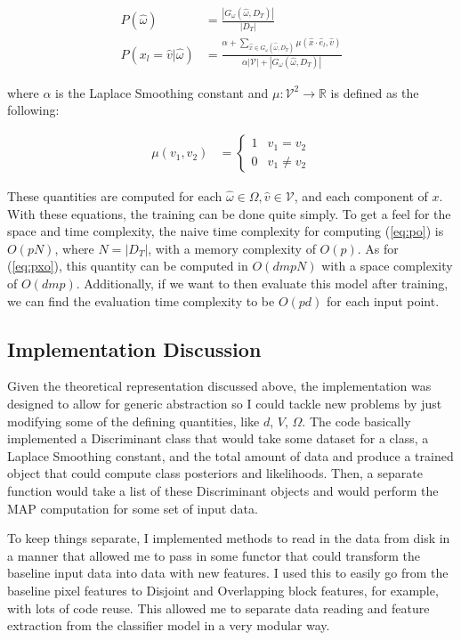 \documentclass{article}[12pt]
\begin{document}
   \begin{align}
   P(\hat{\omega}) &= \frac{|G_{\omega}(\hat{\omega}, D_T)|}{|D_T|} \label{eq:po}\\
   P(x_l = \hat{v} | \hat{\omega}) &= \frac{ \alpha + \sum_{ \hat{x} \in G_{\omega}(\hat{\omega}, D_T) } \mu(\hat{x} \cdot \hat{e}_l, \hat{v}) }{ \alpha |\mathcal{V}| +  |G_{\omega}(\hat{\omega}, D_T)|} \label{eq:pxo}
   \end{align}
   
   where $\alpha$ is the Laplace Smoothing constant and $\mu: \mathcal{V}^2 \rightarrow \mathbb{R}$ is defined as the following:
   
   \begin{align}
   \mu(v_1, v_2) &= \begin{cases}
   1 & v_1 = v_2 \\
   0 & v_1 \neq v_2
   \end{cases}
   \end{align}
   
   These quantities are computed for each $\hat{\omega} \in \Omega, \hat{v} \in \mathcal{V}$, and each component of $x$. With these equations, the training can be done quite simply. To get a feel for the space and time complexity, the naive time complexity for computing (\ref{eq:po}) is $O(pN)$, where $N = |D_T|$, with a memory complexity of $O(p)$. As for (\ref{eq:pxo}), this quantity can be computed in $O(dmpN)$ with a space complexity of $O(dmp)$. Additionally, if we want to then evaluate this model after training, we can find the evaluation time complexity to be $O(pd)$ for each input point.
   
   
   \subsection{Implementation Discussion}
   Given the theoretical representation discussed above, the implementation was designed to allow for generic abstraction so I could tackle new problems by just modifying some of the defining quantities, like $d$, $V$, $\Omega$. The code basically implemented a Discriminant class that would take some dataset for a class, a Laplace Smoothing constant, and the total amount of data and produce a trained object that could compute class posteriors and likelihoods. Then, a separate function would take a list of these Discriminant objects and would perform the MAP computation for some set of input data.
   
   To keep things separate, I implemented methods to read in the data from disk in a manner that allowed me to pass in some functor that could transform the baseline input data into data with new features. I used this to easily go from the baseline pixel features to Disjoint and Overlapping block features, for example, with lots of code reuse. This allowed me to separate data reading and feature extraction from the classifier model in a very modular way.
   
\end{document}

